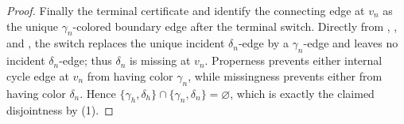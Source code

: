\begin{proof}
Finally the terminal certificate and
 identify the connecting edge at
\(v_n\) as the unique \(\gamma_n\)-colored boundary edge after the terminal
switch.  Directly from ,
, and
, the switch replaces the unique incident
\(\delta_n\)-edge by a \(\gamma_n\)-edge and leaves no incident
\(\delta_n\)-edge; thus \(\delta_n\) is missing at \(v_n\).  Properness
prevents either internal cycle edge at \(v_n\) from having color
\(\gamma_n\), while missingness prevents either from having color
\(\delta_n\).  Hence
\(\{\gamma_h,\delta_h\}\cap\{\gamma_n,\delta_n\}=\varnothing\), which is
exactly the claimed disjointness by (1).
\end{proof}
